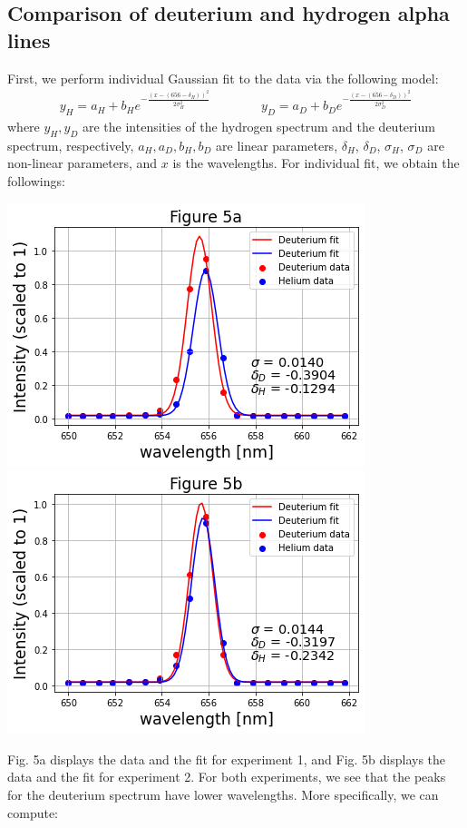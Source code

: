 \documentclass[11pt]{book}
\theoremstyle{break}
\theoremstyle{break}
\begin{document}
\subsection{Comparison of deuterium and hydrogen alpha lines}
First, we perform individual Gaussian fit to the data via the following model:
\begin{align}
y_H = a_H  + b_H e^{-\frac{(x-(656-\delta_H))^2}{2\sigma_H^2}}\qquad\qquad y_D = a_D  + b_D e^{-\frac{(x-(656-\delta_D))^2}{2\sigma_D^2}}
\end{align}
where $y_H,y_D$ are the intensities of the hydrogen spectrum and the deuterium spectrum, respectively, $a_H,a_D,b_H, b_D$ are linear parameters, $\delta_H$, $\delta_D$, $\sigma_H$, $\sigma_D$ are non-linear parameters, and $x$ is the wavelengths. For individual fit, we obtain the followings:
\begin{center}
\includegraphics[scale=0.55]{5a}
\includegraphics[scale=0.55]{5b}
\end{center}
Fig. 5a displays the data and the fit for experiment 1, and Fig. 5b displays the data and the fit for experiment 2. For both experiments, we see that the peaks for the deuterium spectrum have lower wavelengths. More specifically, we can compute:
\end{document}
